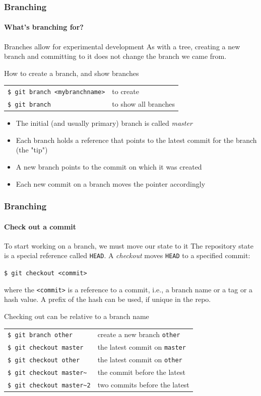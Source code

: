 \begin{frame}
\frametitle{Branching}
\framesubtitle{What's branching for?}

\begin{block}{Branches allow for experimental development}
As with a tree, creating a new branch and committing to it does not change the branch we came from.
\end{block}

\begin{block}{How to create a branch, and show branches}
\begin{tabular}{ll}
\texttt{\$ git branch <mybranchname>} & to create \\
\texttt{\$ git branch} & to show all branches
\end{tabular}

\medskip
\begin{itemize}
\item The initial (and usually primary) branch is called {\em master}
\item Each branch holds a reference that points to the latest commit for the branch (the "tip")
\item A new branch points to the commit on which it was created
\item Each new commit on a branch moves the pointer accordingly
\end{itemize}
\end{block}

\end{frame}

\begin{frame}
\frametitle{Branching}
\framesubtitle{Check out a commit}

\begin{block}{To start working on a branch, we must move our state to it}
The repository state is a special reference called \texttt{HEAD}. A {\em checkout} moves \texttt{HEAD} to a specified commit:

\texttt{\$ git checkout <commit>}

\medskip
where the \texttt{<commit>} is a reference to a commit, i.e., a branch name or a tag or a hash value. A prefix of the hash can be used, if unique in the repo. 
\end{block}

\pause
\begin{block}{Checking out can be relative to a branch name}
\begin{tabular}{ll}
\texttt{\$ git branch other} & create a new branch \texttt{other} \\
\texttt{\$ git checkout master} & the latest commit on \texttt{master} \\
\texttt{\$ git checkout other} & the latest commit on \texttt{other} \\
\texttt{\$ git checkout master\textasciitilde{}} & the commit before the latest \\
\texttt{\$ git checkout master\textasciitilde{}2} & two commits before the latest
\end{tabular}
\end{block}
\end{frame}

